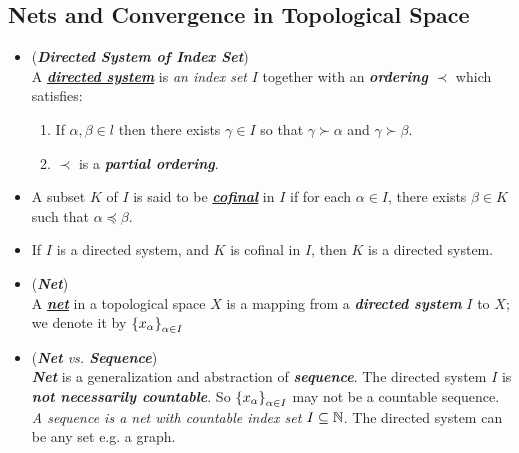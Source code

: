 \documentclass[11pt]{article}
\begin{document}
\subsection{Nets and Convergence in Topological Space}
\begin{itemize}
\item \begin{definition} (\emph{\textbf{Directed System of Index Set}})\\
A \underline{\emph{\textbf{directed system}}} is \emph{an index set} $I$ together with an \emph{\textbf{ordering}} $\prec$ which satisfies:
\begin{enumerate}
\item If $\alpha, \beta \in l$ then there exists $\gamma \in I$ so that $\gamma \succ \alpha$ and $\gamma \succ \beta$.
\item $\prec$  is a \textbf{\emph{partial ordering}}.
\end{enumerate}
\end{definition}

\item \begin{definition}
A subset $K$ of $I$ is said to be \underline{\emph{\textbf{cofinal}}} in $I$ if for each $\alpha \in I$, there exists $\beta \in K$ such that $\alpha \preceq \beta$. 
\end{definition}

\item \begin{proposition}
If $I$ is a directed system, and $K$ is cofinal in $I$, then $K$ is a directed system. 
\end{proposition}

\item \begin{definition} (\textbf{\emph{Net}})\\
A \underline{\emph{\textbf{net}}} in a topological space $X$ is a mapping from a \emph{\textbf{directed system}} $I$ to $X$; we denote it by $\left\{x_\alpha\right\}_{\alpha \in I}$
\end{definition}

\item \begin{remark} (\emph{\textbf{Net} vs. \textbf{Sequence}})\\
\emph{\textbf{Net}} is a generalization and abstraction of \emph{\textbf{sequence}}. The directed system $I$ is \emph{\textbf{not necessarily countable}}. So $\left\{x_\alpha\right\}_{\alpha \in I}$ may not be a countable sequence. \emph{A sequence is a net with countable index set $I \subseteq {\mathbb N}$}. The directed system can be any set e.g. a graph.
\end{remark}


\end{itemize}
\end{document}
